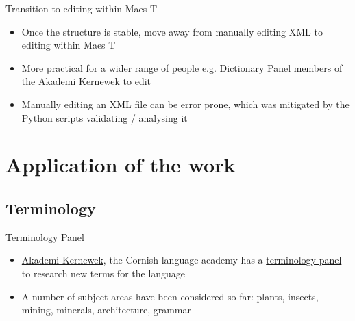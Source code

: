 \documentclass{beamer}
\begin{document}
\begin{frame}{Transition to editing within Maes T}
\begin{itemize}
\item<1-> Once the structure is stable, move away from manually editing XML to editing within Maes T
\item<2-> More practical for a wider range of people e.g. Dictionary Panel members of the Akademi Kernewek to edit
\item<3-> Manually editing an XML file can be error prone, which was mitigated by the
Python scripts validating / analysing it
\end{itemize}
\end{frame}
\section{Application of the work}
\subsection{Terminology}
\begin{frame}{Terminology Panel}
\begin{itemize}
\item<1-> \href{http://www.akademikernewek.org.uk/}{Akademi Kernewek}, the Cornish language academy has a \href{https://akademikernewek.weebly.com/terminology.html}{terminology panel} to research new terms for the language
\item<2-> A number of subject areas have been considered so far: plants, insects, mining, minerals, architecture, grammar
\end{itemize}
\end{frame}
\end{document}
